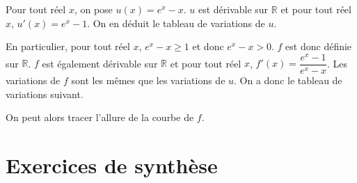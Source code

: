 \documentclass[11pt,fleqn, openany]{book} %
\begin{document}
\begin{solution}Pour tout réel $x$, on pose $u(x)=e^x-x$. $u$ est dérivable sur $\mathbb{R}$ et pour tout réel $x$, $u'(x)=e^x-1$. On en déduit le tableau de variations de $u$.
	

\begin{center}
\end{center}


En particulier, pour tout réel $x$, $e^x-x\geqslant 1$ et donc $e^x-x>0$. $f$ est donc définie sur $\mathbb{R}$. $f$ est également dérivable sur $\mathbb{R}$ et pour tout réel $x$, $f'(x)=\dfrac{e^x-1}{e^x-x}$. Les variations de $f$ sont les mêmes que les variations de $u$. On a donc le tableau de variations suivant.

\begin{center}
\end{center}

On peut alors tracer l'allure de la courbe de $f$.

\begin{center}
\end{center}

\end{solution}



\section*{Exercices de synthèse}
\end{document}
